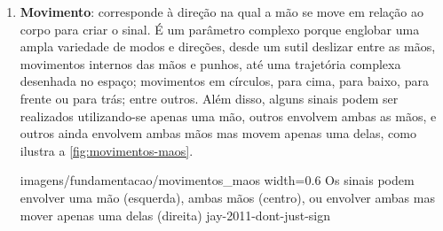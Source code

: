 \begin{enumerate}
        {imagens/fundamentacao/orientacoes} %
        {width=0.5\linewidth} %
        {Orientações assumidas pela palma da mão na articulação de um sinal} %
        {quadros-2004-estudos-linguisticos} %
    





    \item \textbf{Movimento}: corresponde à direção na qual a mão se move em relação ao corpo para criar o sinal. É um parâmetro complexo porque englobar uma ampla variedade de modos e direções, desde um sutil deslizar entre as mãos, movimentos internos das mãos e punhos, até uma trajetória complexa desenhada no espaço; movimentos em círculos, para cima, para baixo, para frente ou para trás; entre outros.
    Além disso, alguns sinais podem ser realizados utilizando-se apenas uma mão, outros envolvem ambas as mãos, e outros ainda envolvem ambas mãos mas movem apenas uma delas, como ilustra a \autoref{fig:movimentos-maos}.

        {imagens/fundamentacao/movimentos_maos} %
        {width=0.6\linewidth} %
        {Os sinais podem envolver uma mão (esquerda), ambas mãos (centro), ou envolver ambas mas mover apenas uma delas (direita)} %
        {jay-2011-dont-just-sign} %

 



\end{enumerate}
